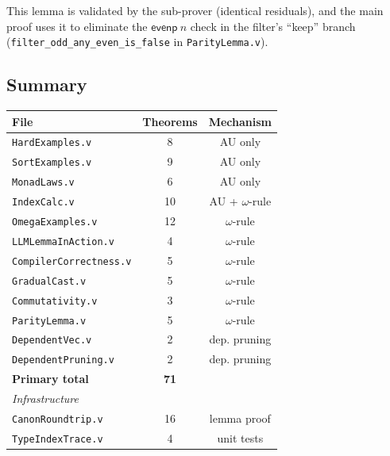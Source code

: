 This lemma is validated by the sub-prover (identical residuals), and the
main proof uses it to eliminate the $\mathsf{evenp}\ n$ check in the
filter's ``keep'' branch (\texttt{filter\_odd\_any\_even\_is\_false} in
\texttt{ParityLemma.v}).

\subsection{Summary}

\begin{center}
\small
\begin{tabular}{lcc}
\toprule
\textbf{File} & \textbf{Theorems} & \textbf{Mechanism} \\
\midrule
\texttt{HardExamples.v}          & 8  & AU only \\
\texttt{SortExamples.v}          & 9  & AU only \\
\texttt{MonadLaws.v}             & 6  & AU only \\
\texttt{IndexCalc.v}             & 10 & AU + $\omega$-rule \\
\texttt{OmegaExamples.v}         & 12 & $\omega$-rule \\
\texttt{LLMLemmaInAction.v}      & 4  & $\omega$-rule \\
\texttt{CompilerCorrectness.v}   & 5  & $\omega$-rule \\
\texttt{GradualCast.v}           & 5  & $\omega$-rule \\
\texttt{Commutativity.v}        & 3  & $\omega$-rule \\
\texttt{ParityLemma.v}          & 5  & $\omega$-rule \\
\texttt{DependentVec.v}          & 2  & dep. pruning \\
\texttt{DependentPruning.v}       & 2  & dep. pruning \\
\midrule
\textbf{Primary total}           & \textbf{71} & \\
\addlinespace
\textit{Infrastructure}          &     & \\
\texttt{CanonRoundtrip.v}        & 16 & lemma proof \\
\texttt{TypeIndexTrace.v}        & 4  & unit tests \\
\bottomrule
\end{tabular}
\end{center}
